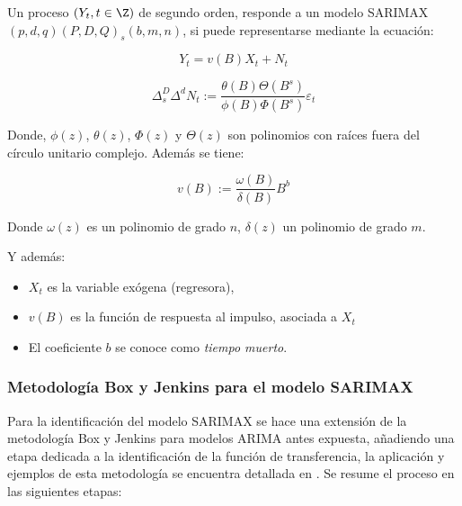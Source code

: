 \documentclass[12pt,oneside]{book}\usepackage[]{graphicx}\usepackage[]{color}
\theoremstyle{definition} %
\begin{document}
\begin{definicion}
Un proceso $(Y_t, t\in\Z)$ de segundo orden,  responde a un modelo SARIMAX$(p,d,q)(P,D,Q)_s(b,m,n)$, si puede representarse mediante la ecuación:

\begin{equation} \label{eq:sarimax_def}
Y_t = v(B) X_t  + N_t
\end{equation}

$$\Delta_s^D  \Delta^d N_t := \frac{\theta(B) \Theta (B^s)}{\phi(B)\Phi (B^s)}\varepsilon_t$$

Donde, $\phi (z)$, $\theta (z)$, $\Phi (z)$ y $\Theta (z)$ son polinomios con raíces fuera del círculo unitario complejo. Además se tiene:

$$v (B):= \frac{\omega (B)}{\delta (B)} B^{b}$$

Donde $\omega(z) $ es un polinomio de grado $n$, $\delta(z) $ un polinomio de grado $m$. 


\end{definicion}

Y además:

\begin{itemize}
\item $X_t $ es la variable exógena (regresora),
\item $v(B)$ es la función de respuesta al impulso, asociada a $X_t$
\item El coeficiente $b$ se conoce como \textit{tiempo muerto}.
\end{itemize}


\subsubsection{Metodología Box y Jenkins para el modelo SARIMAX}
\label{sec:metod_sarimax}
Para la identificación del modelo SARIMAX se hace una extensión de la metodología Box y Jenkins para modelos ARIMA antes expuesta, añadiendo una etapa dedicada a la identificación de la función de transferencia, la aplicación y ejemplos de esta metodología se encuentra detallada en \citeauthor{novales1993econometria} \citeyear{novales1993econometria}. Se resume el proceso en las siguientes etapas:
\end{document}
